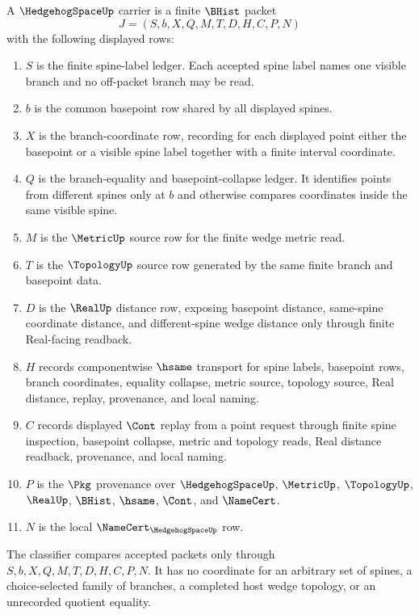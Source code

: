 \begin{definition}
\label{def:hedgehog-space-carrier}
A $\HedgehogSpaceUp$ carrier is a finite $\BHist$ packet
$$
J=(S,b,X,Q,M,T,D,H,C,P,N)
$$
with the following displayed rows:
\begin{enumerate}
\item $S$ is the finite spine-label ledger. Each accepted spine label names one visible branch and no off-packet branch may be read.
\item $b$ is the common basepoint row shared by all displayed spines.
\item $X$ is the branch-coordinate row, recording for each displayed point either the basepoint or a visible spine label together with a finite interval coordinate.
\item $Q$ is the branch-equality and basepoint-collapse ledger. It identifies points from different spines only at $b$ and otherwise compares coordinates inside the same visible spine.
\item $M$ is the $\MetricUp$ source row for the finite wedge metric read.
\item $T$ is the $\TopologyUp$ source row generated by the same finite branch and basepoint data.
\item $D$ is the $\RealUp$ distance row, exposing basepoint distance, same-spine coordinate distance, and different-spine wedge distance only through finite Real-facing readback.
\item $H$ records componentwise $\hsame$ transport for spine labels, basepoint rows, branch coordinates, equality collapse, metric source, topology source, Real distance, replay, provenance, and local naming.
\item $C$ records displayed $\Cont$ replay from a point request through finite spine inspection, basepoint collapse, metric and topology reads, Real distance readback, provenance, and local naming.
\item $P$ is the $\Pkg$ provenance over $\HedgehogSpaceUp$, $\MetricUp$, $\TopologyUp$, $\RealUp$, $\BHist$, $\hsame$, $\Cont$, and $\NameCert$.
\item $N$ is the local $\NameCert_{\HedgehogSpaceUp}$ row.
\end{enumerate}
The classifier compares accepted packets only through
$S,b,X,Q,M,T,D,H,C,P,N$. It has no coordinate for an arbitrary set of spines,
a choice-selected family of branches, a completed host wedge topology, or an
unrecorded quotient equality.
\end{definition}


